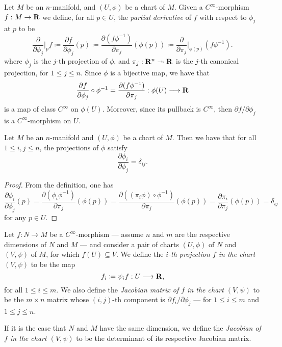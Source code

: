 \begin{definition}
    \label{def:partial-derivative-manifold}
    Let \(M\) be an \(n\)-manifold, and \((U, \phi)\) be a chart of \(M\). Given a
    \(C^{\infty}\)-morphism \(f: M \to \mathbf{R}\) we define, for all \(p \in U\), the
    \emph{partial derivative} of \(f\) with respect to \(\phi_j\) at \(p\) to be
    \[
        \frac{\partial}{\partial \phi_j} \bigg|_p f
        \coloneq \frac{\partial f}{\partial \phi_j}(p)
        \coloneq \frac{\partial (f \phi^{-1})}{\partial \pi_j}(\phi(p))
        \coloneq \frac{\partial}{\partial \pi_{j}} \bigg|_{\phi(p)} (f \phi^{-1}).
    \]
    where \(\phi_j\) is the \(j\)-th projection of \(\phi\), and
    \(\pi_j: \mathbf{R}^n \twoheadrightarrow \mathbf{R}\) is the \(j\)-th canonical projection, for
    \(1 \leq j \leq n\). Since \(\phi\) is a bijective map, we have that
    \[
        \frac{\partial f}{\partial \phi_j} \circ \phi^{-1}
        = \frac{\partial (f \phi^{-1})}{\partial \pi_j}:
        \phi(U) \longrightarrow \mathbf{R}
    \]
    is a map of class \(C^{\infty}\) on \(\phi(U)\). Moreover, since its pullback is
    \(C^{\infty}\), then \(\partial f/\partial \phi_j\) is a \(C^{\infty}\)-morphism on \(U\).
\end{definition}

\begin{proposition}
    \label{prop:partial-derivative-distinct-projections}
    Let \(M\) be an \(n\)-manifold and \((U, \phi)\) be a chart of \(M\). Then we
    have that for all \(1 \leq i, j \leq n\), the projections of \(\phi\) satisfy
    \[
        \frac{\partial \phi_i}{\partial \phi_j} = \delta_{i j}.
    \]
\end{proposition}

\begin{proof}
    From the definition, one has
    \[
        \frac{\partial \phi_{i}}{\partial \phi_j} (p)
        = \frac{\partial (\phi_{i} \phi^{-1})}{\partial \pi_j} (\phi(p))
        = \frac{\partial ((\pi_i \phi) \circ \phi^{-1})}{\partial \pi_j} (\phi(p))
        = \frac{\partial \pi_i}{\partial \pi_j} (\phi(p))
        = \delta_{i j}
    \]
    for any \(p \in U\).
\end{proof}

\begin{definition}[Jacobian]
    \label{def:}
    Let \(f: N \to M\) be a \(C^{\infty}\)-morphism --- assume \(n\) and \(m\) are
    the respective dimensions of \(N\) and \(M\) --- and consider a pair of charts
    \((U, \phi)\) of \(N\) and \((V, \psi)\) of \(M\), for which
    \(f(U) \subseteq V\). We define the \emph{\(i\)-th projection \(f\) in the chart
        \((V, \psi)\)} to be the map
    \[
        f_i \coloneq \psi_i f: U \longrightarrow \mathbf{R},
    \]
    for all \(1 \leq i \leq m\).  We also define the \emph{Jacobian matrix of \(f\)
        in the chart \((V, \psi)\)} to be the \(m \times n\) matrix whose
    \((i, j)\)-th component is \(\partial f_i/\partial \phi_j\) --- for
    \(1 \leq i \leq m\) and \(1 \leq j \leq n\).

    If it is the case that \(N\) and \(M\) have the same dimension, we define the
    \emph{Jacobian of \(f\) in the chart \((V, \psi)\)} to be the determinant of its
    respective Jacobian matrix.
\end{definition}

